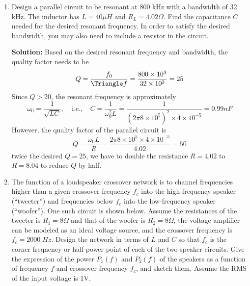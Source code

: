 \begin{enumerate}
%
% 

\item Design a parallel circuit to be resonant at 800 kHz with a bandwidth
of 32 kHz. The inductor has $L=40 \mu H$ and $R_L=4.02 \Omega$. Find the
capacitance $C$ needed for the desired resonant frequency. In order to 
satisfy the desired bandwidth, you may also need to include a resistor in 
the circuit. 

  {\bf Solution:} Based on the desired resonant frequency and bandwidth, 
  the quality factor needs to be
  \[ Q=\frac{f_0}{\Triangle f}=\frac{800\times 10^3}{32 \times 10^3}=25 \]
  Since $Q>20$, the resonant frequency is approximately
  \[ \omega_0=\frac{1}{\sqrt{LC}},\;\;\;\;\mbox{i.e.,}\;\;\;\;
  C=\frac{1}{\omega_0^2 L}=\frac{1}{(2\pi 8\times 10^5)^2\times 4\times 10^{-5}}
  =0.99 nF \]
  However, the quality factor of the parallel circuit is
  \[ Q=\frac{\omega_0 L}{R}=\frac{2\pi 8 \times 10^5 \times 4\times 10^{-5}}
 	{4.02}=50 \]
  twice the desired $Q=25$, we have to double the resistance $R=4.02$ to 
  $R=8.04$ to reduce $Q$ by half.

\item The function of a loudspeaker crossover network is to channel 
frequencies higher than a given crossover frequency $f_c$ into the
high-frequency speaker (``tweeter'') and frequencies below $f_c$ into
the low-frequency speaker (``woofer''). One such circuit is shown below.
Assume the resistances of the tweeter is $R_1=8\Omega$ and that of the 
woofer is $R_2=8\Omega$, the voltage amplifier can be modeled as an
ideal voltage source, and the crossover frequency is $f_c=2000\; Hz$.
Design the network in terms of $L$ and $C$ so that $f_c$ is the corner
freqnency or half-power point of each of the two speaker circuits. Give 
the expression of the power $P_1(f)$ and $P_2(f)$ of the speakers as a 
function of frequency $f$ and crossover frequency $f_c$, and sketch them.
Assume the RMS of the input voltage is 1V.



\end{enumerate}
